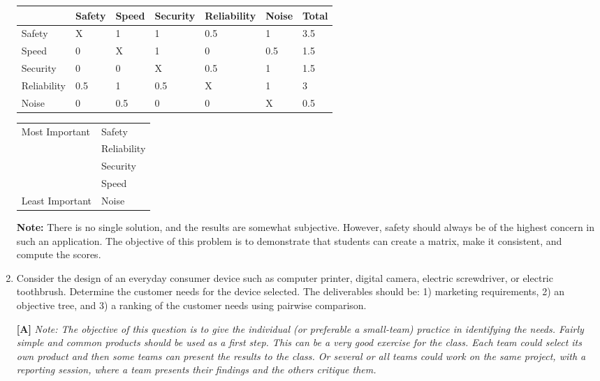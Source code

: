 \begin{enumerate}
\begin{onlysolution}
	\begin{tabular}{l|l|l|l|l|l|l} \\
		& Safety	& Speed	& Security	& Reliability	& Noise		& Total \\ \hline
Safety	&	X		&	1		&	1		&	0.5		&		1	&	3.5		\\ \hline
Speed	&	0		&	X		&	1		&	0		&	0.5		&	1.5		\\ \hline
Security	&	0		&	0		&	X		&	0.5		&	1		&	1.5		\\ \hline
Reliability&	0.5		&	1		&	0.5		&	X		&	1		&	3		\\ \hline
Noise	&	0		&	0.5		&	0		&	0		&	X		&	0.5		\\ 
	\end{tabular}
  
	\begin{tabular}{l l} \\
	Most Important 	& Safety		\\ 
					& Reliability		\\ 
					& Security		\\ 
					& Speed		\\ 
	Least Important & Noise			\\
	\end{tabular}					
	
     \hspace*{1cm}
  \begin{minipage}{.8\textwidth}
  \textbf{Note:} There is no single solution, and the results are somewhat 
  subjective. However, safety should always be of the highest concern in 
  such an application. The objective of this problem is to demonstrate 
  that students can create a matrix, make it consistent, and compute the 
  scores.
  \end{minipage}
  \end{onlysolution}

\item
  Consider the design of an everyday consumer device such as computer
  printer, digital camera, electric screwdriver, or electric toothbrush.
  Determine the customer needs for the device selected. The deliverables
  should be: 1) marketing requirements, 2) an objective tree, and 3) a
  ranking of the customer needs using pairwise comparison.
  
  \begin{onlysolution}
  \textbf{[A]}
  \itshape
  \emph{Note:} The objective of this question is to give the individual 
  (or preferable a small-team) practice in identifying the needs. Fairly 
  simple and common products should be used as a first step. This can be 
  a very good exercise for the class. Each team could select its own product 
  and then some teams can present the results to the class. Or several or 
  all teams could work on the same project, with a reporting session, where 
  a team presents their findings and the others critique them.
  

\end{onlysolution}
\end{enumerate}

